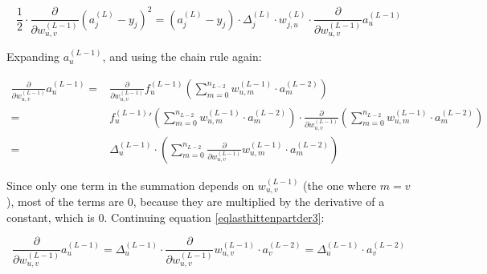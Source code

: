 \documentclass{article}
\begin{document}
          \begin{equation}\label{eqlasthittenpartder2}
            \frac{1}{2}
            \cdot
            \frac{\partial}{\partial w_{u,v}^{(L-1)}}
              \left( a_j^{(L)} - y_j \right)^2
                = \left( a_j^{(L)} - y_j \right)
                  \cdot
                  \Delta_j^{(L)}
                  \cdot
                  w_{j,u}^{(L)}
                  \cdot
                  \frac{\partial}{\partial w_{u,v}^{(L-1)}}
                    a_{u}^{(L-1)}
          \end{equation}

          Expanding $a_{u}^{(L-1)}$, and using the chain rule again:

          \begin{equation}\label{eqlasthittenpartder3}
            \begin{split}
              \frac{\partial}{\partial w_{u,v}^{(L-1)}}
                a_{u}^{(L-1)}
                  = & \frac{\partial}{\partial w_{u,v}^{(L-1)}}
                      f_{u}^{(L-1)} \left(
                        \sum_{m=0}^{n_{L-2}}
                          w_{u,m}^{(L-1)} \cdot a_m^{(L-2)}
                      \right) \\
                  = & {f_{u}^{(L-1)}}' \left(
                        \sum_{m=0}^{n_{L-2}}
                          w_{u,m}^{(L-1)} \cdot a_m^{(L-2)}
                      \right)
                      \cdot
                      \frac{\partial}{\partial w_{u,v}^{(L-1)}}
                        \left(
                          \sum_{m=0}^{n_{L-2}}
                            w_{u,m}^{(L-1)} \cdot a_m^{(L-2)}
                        \right) \\
                  = & \Delta_u^{(L-1)}
                      \cdot
                      \left(
                        \sum_{m=0}^{n_{L-2}}
                          \frac{\partial}{\partial w_{u,v}^{(L-1)}}
                            w_{u,m}^{(L-1)} \cdot a_m^{(L-2)}
                      \right)
            \end{split}
          \end{equation}

          Since only one term in the summation depends on $w_{u,v}^{(L-1)}$
          (the one where $m = v$), most of the terms are $0$, because they are
          multiplied by the derivative of a constant, which is $0$. Continuing
          equation \ref{eqlasthittenpartder3}:

          \begin{equation}
            \frac{\partial}{\partial w_{u,v}^{(L-1)}}
              a_{u}^{(L-1)}
                = \Delta_u^{(L-1)}
                  \cdot
                  \frac{\partial}{\partial w_{u,v}^{(L-1)}}
                    w_{u,v}^{(L-1)} \cdot a_{v}^{(L-2)}
                = \Delta_u^{(L-1)} \cdot a_{v}^{(L-2)}
          \end{equation}
\end{document}
